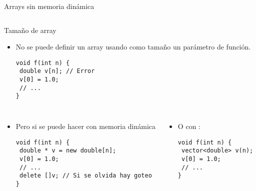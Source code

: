 \begin{frame}[t,fragile]{Arrays sin memoria dinámica}
\begin{columns}[T]
\end{columns}

\end{frame}

\begin{frame}[t,fragile]{Tamaño de array}
\begin{itemize}
  \item No se puede definir un array usando como tamaño un parámetro de función.
\begin{lstlisting}
void f(int n) {
 double v[n]; // Error
 v[0] = 1.0;
 // ...
}
\end{lstlisting}
\end{itemize}

\begin{columns}[T]

\begin{itemize}
  \item Pero si se puede hacer con memoria dinámica
\begin{lstlisting}
void f(int n) {
 double * v = new double[n];
 v[0] = 1.0;
 // ...
 delete []v; // Si se olvida hay goteo
}
\end{lstlisting}
\end{itemize}

\begin{itemize}
  \item O con :
\begin{lstlisting}
void f(int n) {
 vector<double> v(n);
 v[0] = 1.0;
 // ...
}
\end{lstlisting}
\end{itemize}
\end{columns}

\end{frame}

